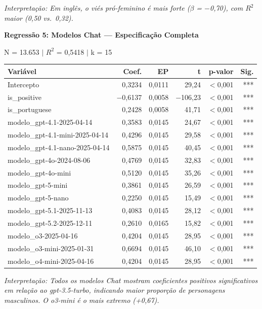 \documentclass[12pt,a4paper]{article}
\begin{document}
\noindent\textit{Interpretação: Em inglês, o viés pró-feminino é mais forte ($\beta$ = $-$0,70),
com $R^2$ maior (0,50 vs.\ 0,32).}

\vspace{0.5cm}
\noindent\textbf{Regressão 5: Modelos Chat --- Especificação Completa}

\noindent N = 13.653 $|$ $R^2$ = 0,5418 $|$ k = 15

\begin{table}[H]
\centering
\small
\begin{tabular}{lrrrrr}
\toprule
\textbf{Variável} & \textbf{Coef.} & \textbf{EP} & \textbf{t} & \textbf{p-valor} & \textbf{Sig.} \\
\midrule
Intercepto & 0,3234 & 0,0111 & 29,24 & $<$0,001 & *** \\
is\_positive & $-$0,6137 & 0,0058 & $-$106,23 & $<$0,001 & *** \\
is\_portuguese & 0,2428 & 0,0058 & 41,71 & $<$0,001 & *** \\
modelo\_gpt-4.1-2025-04-14 & 0,3583 & 0,0145 & 24,67 & $<$0,001 & *** \\
modelo\_gpt-4.1-mini-2025-04-14 & 0,4296 & 0,0145 & 29,58 & $<$0,001 & *** \\
modelo\_gpt-4.1-nano-2025-04-14 & 0,5875 & 0,0145 & 40,45 & $<$0,001 & *** \\
modelo\_gpt-4o-2024-08-06 & 0,4769 & 0,0145 & 32,83 & $<$0,001 & *** \\
modelo\_gpt-4o-mini & 0,5120 & 0,0145 & 35,26 & $<$0,001 & *** \\
modelo\_gpt-5-mini & 0,3861 & 0,0145 & 26,59 & $<$0,001 & *** \\
modelo\_gpt-5-nano & 0,2250 & 0,0145 & 15,49 & $<$0,001 & *** \\
modelo\_gpt-5.1-2025-11-13 & 0,4083 & 0,0145 & 28,12 & $<$0,001 & *** \\
modelo\_gpt-5.2-2025-12-11 & 0,2610 & 0,0165 & 15,82 & $<$0,001 & *** \\
modelo\_o3-2025-04-16 & 0,4204 & 0,0145 & 28,95 & $<$0,001 & *** \\
modelo\_o3-mini-2025-01-31 & 0,6694 & 0,0145 & 46,10 & $<$0,001 & *** \\
modelo\_o4-mini-2025-04-16 & 0,4204 & 0,0145 & 28,95 & $<$0,001 & *** \\
\bottomrule
\end{tabular}
\end{table}

\noindent\textit{Interpretação: Todos os modelos Chat mostram coeficientes positivos
significativos em relação ao gpt-3.5-turbo, indicando maior proporção de
personagens masculinos. O o3-mini é o mais extremo (+0,67).}
\end{document}
